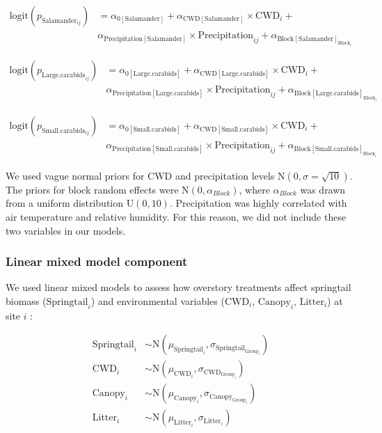 \begin{align}
  \text{logit}(p_{\text{Salamander}_{ij}}) &= \alpha_{0[\text{Salamander}]} + \alpha_{\text{CWD}[\text{Salamander}]} \times \text{CWD}_i + \nonumber \\
  &\alpha_{\text{Precipitation}[\text{Salamander}]} \times \text{Precipitation}_{ij} + \alpha_{\text{Block}[\text{Salamander}]_{\text{Block}_i}} \nonumber
\end{align}

\begin{align}
  \text{logit}(p_{\text{Large.carabids}_{ij}}) &= \alpha_{0[\text{Large.carabids}]} + \alpha_{\text{CWD}[\text{Large.carabids}]} \times \text{CWD}_i + \\
  &\alpha_{\text{Precipitation}[\text{Large.carabids}]} \times \text{Precipitation}_{ij} + \alpha_{\text{Block}[\text{Large.carabids}]_{\text{Block}_i}} \nonumber 
\end{align}

\begin{align}
  \text{logit}(p_{\text{Small.carabids}_{ij}}) &= \alpha_{0[\text{Small.carabids}]} + \alpha_{\text{CWD}[\text{Small.carabids}]} \times \text{CWD}_i + \nonumber \\
  &\alpha_{\text{Precipitation}[\text{Small.carabids}]} \times \text{Precipitation}_{ij} + \alpha_{\text{Block}[\text{Small.carabids}]_{\text{Block}_i}} \nonumber 
\end{align}


We used vague normal priors for CWD and precipitation levels $\text{N}(0, \sigma = \sqrt{10})$. 
The priors for block random effects were $\text{N}(0, \alpha_{Block})$, where $\alpha_{Block}$ was drawn from a uniform distribution $\text{U}(0, 10)$. 
Precipitation was highly correlated with air temperature and relative humidity. 
For this reason, we did not include these two variables in our models.


\subsubsection{Linear mixed model component} 

We used linear mixed models to assess how overstory treatments affect springtail biomass ($\text{Springtail}_{i}$) and 
environmental variables ($\text{CWD}_{i}$, $\text{Canopy}_{i}$, $\text{Litter}_{i}$) at site $i$ :

\begin{align}
  \text{Springtail}_{i} &\sim \text{N} (\mu_{\text{Springtail}_i}, \sigma_{\text{Springtail}_{\text{Group}_i}}) \nonumber \\
  \text{CWD}_{i} &\sim \text{N} (\mu_{\text{CWD}_i}, \sigma_{\text{CWD}_{\text{Group}_i}}) \\
  \text{Canopy}_{i} &\sim \text{N} (\mu_{\text{Canopy}_i}, \sigma_{\text{Canopy}_{\text{Group}_i}}) \nonumber \\
  \text{Litter}_{i} &\sim \text{N} (\mu_{\text{Litter}_i}, \sigma_{\text{Litter}_{i}}) \nonumber 
\end{align}

